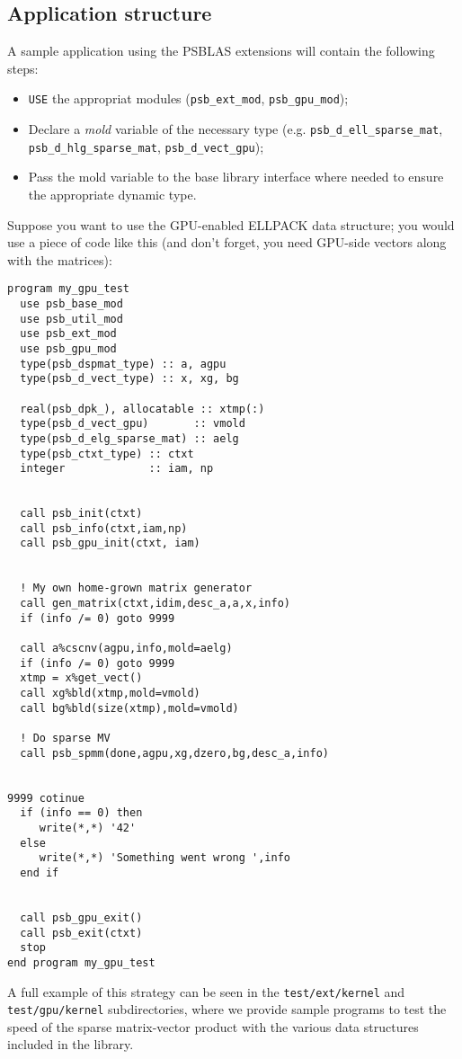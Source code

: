 \subsection{Application structure}
\label{sec:appstruct}
A sample application using the PSBLAS extensions will contain the
following steps:
\begin{itemize}
\item \verb|USE| the appropriat modules (\verb|psb_ext_mod|,
  \verb|psb_gpu_mod|);
\item Declare a \emph{mold} variable of the necessary type
  (e.g. \verb|psb_d_ell_sparse_mat|, \verb|psb_d_hlg_sparse_mat|,
  \verb|psb_d_vect_gpu|);
\item Pass the mold variable to the base library interface where
  needed to ensure the appropriate dynamic type.
\end{itemize}
Suppose you want to use the GPU-enabled ELLPACK data structure; you
would use a piece of code like this (and don't forget, you need
GPU-side vectors along with the matrices):
\lstset{language=Fortran}
\begin{lstlisting}
program my_gpu_test
  use psb_base_mod
  use psb_util_mod 
  use psb_ext_mod
  use psb_gpu_mod
  type(psb_dspmat_type) :: a, agpu
  type(psb_d_vect_type) :: x, xg, bg

  real(psb_dpk_), allocatable :: xtmp(:)
  type(psb_d_vect_gpu)       :: vmold
  type(psb_d_elg_sparse_mat) :: aelg
  type(psb_ctxt_type) :: ctxt
  integer             :: iam, np


  call psb_init(ctxt)
  call psb_info(ctxt,iam,np)
  call psb_gpu_init(ctxt, iam)

  
  ! My own home-grown matrix generator
  call gen_matrix(ctxt,idim,desc_a,a,x,info)
  if (info /= 0) goto 9999

  call a%cscnv(agpu,info,mold=aelg)
  if (info /= 0) goto 9999
  xtmp = x%get_vect() 
  call xg%bld(xtmp,mold=vmold)
  call bg%bld(size(xtmp),mold=vmold)
  
  ! Do sparse MV
  call psb_spmm(done,agpu,xg,dzero,bg,desc_a,info)

 
9999 cotinue
  if (info == 0) then 
     write(*,*) '42'
  else
     write(*,*) 'Something went wrong ',info
  end if
  
  
  call psb_gpu_exit()
  call psb_exit(ctxt)
  stop
end program my_gpu_test
\end{lstlisting}
A full example of this strategy can be seen in the
\verb|test/ext/kernel| and \verb|test/gpu/kernel| subdirectories,
where we provide  sample programs 
to test the speed of the sparse matrix-vector product with the various
data structures included in the library. 





